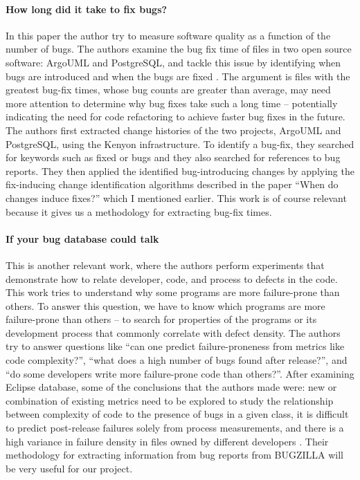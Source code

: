 {\paragraph{How long did it take to fix bugs?}
In this paper the author try to measure software quality as a function
of the number of bugs. The authors examine the bug fix time of files
in two open source software: ArgoUML and PostgreSQL, and tackle this
issue by identifying when bugs are introduced and when the bugs are
fixed \cite{2006-long}. The argument is files with the greatest
bug-fix times, whose bug counts are greater than average, may need
more attention to determine why bug fixes take such a long time –
potentially indicating the need for code refactoring to achieve faster
bug fixes in the future. The authors first extracted change histories
of the two projects, ArgoUML and PostgreSQL, using the Kenyon
infrastructure. To identify a bug-fix, they searched for keywords such
as fixed or bugs and they also searched for references to bug
reports. They then applied the identified bug-introducing changes by
applying the fix-inducing change identification algorithms described
in the paper “When do changes induce fixes?” which I mentioned
earlier.  This work is of course relevant because it gives us a
methodology for extracting bug-fix times.

\paragraph{If your bug database could talk}
This is another relevant work, where the authors perform experiments
that demonstrate how to relate developer, code, and process to defects
in the code. This work tries to understand why some programs are more
failure-prone than others.  To answer this question, we have to know
which programs are more failure-prone than others – to search for
properties of the programs or its development process that commonly
correlate with defect density. The authors try to answer questions
like “can one predict failure-proneness from metrics like code
complexity?”, “what does a high number of bugs found after release?”,
and “do some developers write more failure-prone code than
others?”. After examining Eclipse database, some of the conclusions
that the authors made were: new or combination of existing metrics
need to be explored to study the relationship between complexity of
code to the presence of bugs in a given class, it is difficult to
predict post-release failures solely from process measurements, and
there is a high variance in failure density in files owned by
different developers \cite{2006-if}. Their methodology for extracting
information from bug reports from BUGZILLA will be very useful for our
project.

}
